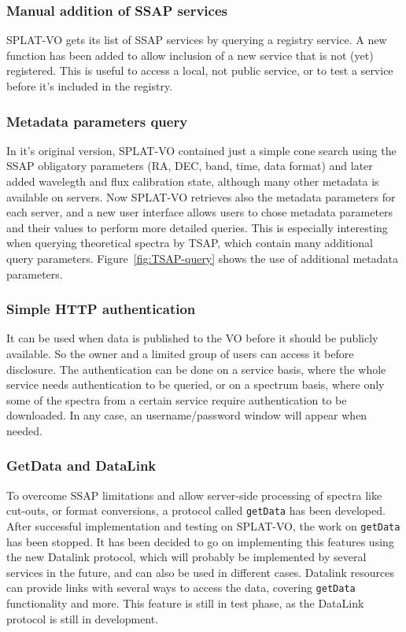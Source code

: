\documentclass[final,authoryear,5p,times,twocolumn]{elsarticle}
\begin{document}
\subsubsection{Manual addition of SSAP services}

SPLAT-VO gets its list of SSAP services by querying a registry
service.  A new function has been added to allow inclusion of a new
service that is not (yet) registered. This is useful to access a
local, not public service, or to test a service before it's included
in the registry.

\subsubsection{Metadata parameters query}

In it's original version, SPLAT-VO contained just a simple cone search using
the SSAP obligatory parameters (RA, DEC, band, time, data format) and later
added wavelegth and flux calibration state, although many other metadata is
available on servers.  Now SPLAT-VO retrieves also the metadata parameters for
each server, and a new user interface allows users to chose metadata
parameters and their values to perform more detailed queries.  This is
especially interesting when querying theoretical spectra by TSAP, which contain many
additional query parameters. Figure~\ref{fig:TSAP-query} shows the
use of additional metadata parameters.

\subsubsection{Simple HTTP authentication}

It can be used when data is published to the VO before it should be
publicly available. So the owner and a limited group of users can
access it before disclosure. The authentication can be done on a
service basis, where the whole service needs authentication to be
queried, or on a spectrum basis, where only some of the spectra from a
certain service require authentication to be downloaded. In any case,
an username/password window will appear when needed.

\subsubsection{GetData and DataLink}

To overcome SSAP limitations and allow server-side processing of
spectra like cut-outs, or format conversions, a protocol called
\texttt{getData} has been developed. After successful implementation and
testing on SPLAT-VO, the work on \texttt{getData} has been stopped. It has been
decided to go on implementing this features using the new Datalink
protocol, which will probably be implemented by several services in
the future, and can also be used in different cases.  Datalink
resources can provide links with several ways to access the data,
covering \texttt{getData} functionality and more. This feature is still in test
phase, as the DataLink protocol is still in development.
\end{document}
